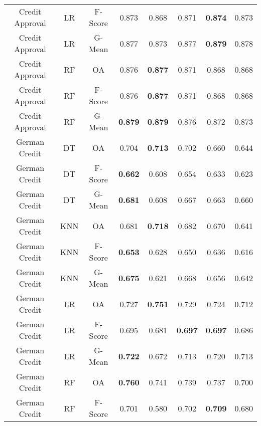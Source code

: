 \begin{longtable}{cccccccc}
   Credit Approval &         LR & F-Score &          0.873 &          0.868 &          0.871 & \textbf{0.874} &          0.873 \\
   Credit Approval &         LR &  G-Mean &          0.877 &          0.873 &          0.877 & \textbf{0.879} &          0.878 \\
   Credit Approval &         RF &      OA &          0.876 & \textbf{0.877} &          0.871 &          0.868 &          0.868 \\
   Credit Approval &         RF & F-Score &          0.876 & \textbf{0.877} &          0.871 &          0.868 &          0.868 \\
   Credit Approval &         RF &  G-Mean & \textbf{0.879} & \textbf{0.879} &          0.876 &          0.872 &          0.873 \\
     German Credit &         DT &      OA &          0.704 & \textbf{0.713} &          0.702 &          0.660 &          0.644 \\
     German Credit &         DT & F-Score & \textbf{0.662} &          0.608 &          0.654 &          0.633 &          0.623 \\
     German Credit &         DT &  G-Mean & \textbf{0.681} &          0.608 &          0.667 &          0.663 &          0.660 \\
     German Credit &        KNN &      OA &          0.681 & \textbf{0.718} &          0.682 &          0.670 &          0.641 \\
     German Credit &        KNN & F-Score & \textbf{0.653} &          0.628 &          0.650 &          0.636 &          0.616 \\
     German Credit &        KNN &  G-Mean & \textbf{0.675} &          0.621 &          0.668 &          0.656 &          0.642 \\
     German Credit &         LR &      OA &          0.727 & \textbf{0.751} &          0.729 &          0.724 &          0.712 \\
     German Credit &         LR & F-Score &          0.695 &          0.681 & \textbf{0.697} & \textbf{0.697} &          0.686 \\
     German Credit &         LR &  G-Mean & \textbf{0.722} &          0.672 &          0.713 &          0.720 &          0.713 \\
     German Credit &         RF &      OA & \textbf{0.760} &          0.741 &          0.739 &          0.737 &          0.700 \\
     German Credit &         RF & F-Score &          0.701 &          0.580 &          0.702 & \textbf{0.709} &          0.680 \\

\end{longtable}
